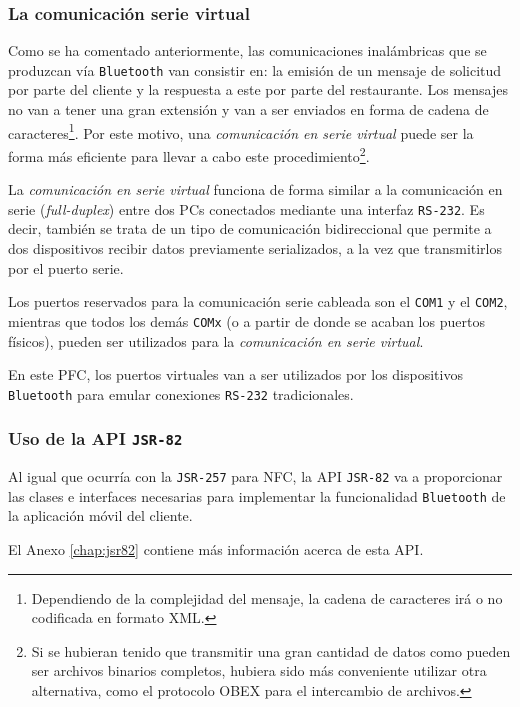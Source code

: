  \subsubsection{La comunicación serie virtual}
Como se ha comentado anteriormente, las comunicaciones inalámbricas que se 
produzcan vía \texttt{Bluetooth} van consistir en: la emisión de un mensaje de 
solicitud por parte del cliente y la respuesta a este por parte del 
restaurante. Los mensajes no van a tener una gran extensión y van a ser 
enviados en forma de cadena de caracteres\footnote{Dependiendo de la 
complejidad del mensaje, la cadena de caracteres irá o no codificada en 
formato \acs{XML}.}. Por este motivo, una \emph{comunicación en serie virtual} 
puede ser la forma más eficiente para llevar a cabo este
procedimiento\footnote{Si se hubieran tenido que transmitir una gran cantidad
de datos como pueden ser archivos binarios completos, hubiera sido más 
conveniente utilizar otra alternativa, como el protocolo \acs{OBEX} para el 
intercambio de archivos.}.

La \emph{comunicación en serie virtual} funciona de forma similar a la
comunicación en serie (\emph{full-duplex}) entre dos PCs conectados 
mediante una interfaz \texttt{RS-232}. Es decir, también se trata de un
tipo de comunicación bidireccional que permite a dos dispositivos
recibir datos previamente serializados, a la vez que transmitirlos por el
puerto serie.

Los puertos reservados para la comunicación serie cableada son el \texttt{COM1}
y el \texttt{COM2}, mientras que todos los demás \texttt{COMx} (o a partir de
donde se acaban los puertos físicos), pueden ser utilizados para la 
\emph{comunicación en serie virtual}.

En este \acs{PFC}, los puertos virtuales van a ser utilizados por los
dispositivos \texttt{Bluetooth} para emular conexiones \texttt{RS-232}
tradicionales.

  \subsubsection{Uso de la \acs{API} \texttt{\acs{JSR}-82}}
Al igual que ocurría con la \texttt{\acs{JSR}-257} para \acs{NFC}, la \acs{API}
\texttt{\acs{JSR}-82} va a proporcionar las clases e interfaces necesarias para
implementar la funcionalidad \texttt{Bluetooth} de la aplicación móvil del
cliente.

El Anexo \ref{chap:jsr82} contiene más información acerca de esta \acs{API}.

